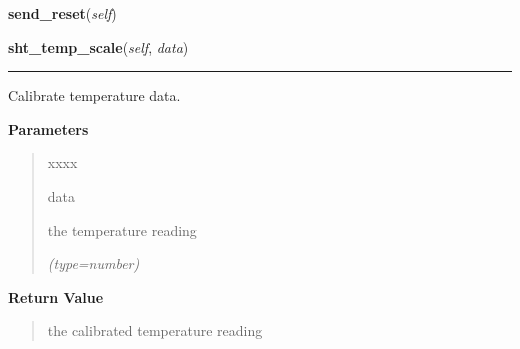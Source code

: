     \label{sensor_thread:Sensor:send_reset}

    \vspace{0.5ex}

\hspace{.8\funcindent}\begin{boxedminipage}{\funcwidth}

    \raggedright \textbf{send\_reset}(\textit{self})

\setlength{\parskip}{2ex}
\setlength{\parskip}{1ex}
    \end{boxedminipage}

    \label{sensor_thread:Sensor:sht_temp_scale}

    \vspace{0.5ex}

\hspace{.8\funcindent}\begin{boxedminipage}{\funcwidth}

    \raggedright \textbf{sht\_temp\_scale}(\textit{self}, \textit{data})

    \vspace{-1.5ex}

    \rule{\textwidth}{0.5\fboxrule}
\setlength{\parskip}{2ex}
    Calibrate temperature data.

\setlength{\parskip}{1ex}
      \textbf{Parameters}
      \vspace{-1ex}

      \begin{quote}
        \begin{Ventry}{xxxx}

          \item[data]

          the temperature reading

            {\it (type=number)}

        \end{Ventry}

      \end{quote}

      \textbf{Return Value}
    \vspace{-1ex}

      \begin{quote}
      the calibrated temperature reading

      \end{quote}

    \end{boxedminipage}

